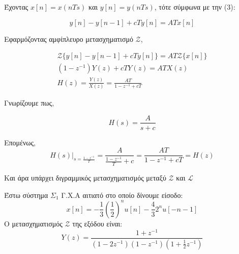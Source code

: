 \documentclass{assignment}
\begin{document}
\begin{answers}
\answer

Έχοντας $x[n] = x(nTs)$ και $y[n] = y(nTs)$, τότε σύμφωνα με την (3):

\begin{equation*}
y[n] - y[n-1] + cTy[n] = ATx[n]
\end{equation*}

Εφαρμόζοντας αμφίπλευρο μετασχηματισμό $\mathscr{Z}$,

\begin{gather*}
\mathscr{Z}\bigg\{y[n] - y[n-1] + cTy[n]\bigg\} = AT\mathscr{Z}\bigg\{x[n]\bigg\} \\
(1-z^{-1})Y(z) + cTY(z) = ATX(z)\\
H(z) = \frac{Y(z)}{X(z)} = \frac{AT}{1-z^{-1}+cT} 
\end{gather*}

\answer
Γνωρίζουμε πως,

\begin{equation*}
H(s) = \frac{A}{s+c}
\end{equation*}

Επομένως, 
\begin{equation*}
\left.H(s)\right|_{s=\frac{1-z^{-1}}{T}} = \frac{A}{\frac{1-z^{-1}}{T} + c} = \frac{AT}{1-z^{-1}+cT} = H(z)
\end{equation*}

Και άρα υπάρχει διγραμμικός μετασχηματισμός μεταξύ $\mathscr{Z}$ και $\mathscr{L}$

\end{answers}


Έστω σύστημα $\Sigma_1$ Γ.Χ.Α αιτιατό στο οποίο δίνουμε είσοδο:
\begin{equation}
x[n]=-\frac{1}{3}(\frac{1}{2})^nu[n]-\frac{4}{3}2^nu[-n-1]
\end{equation}
Ο μετασχηματισμός $\mathscr{Z}$ της εξόδου είναι:
\begin{equation}Y(z) = \frac{1+z^{-1}}{(1-2z^{-1})(1-z^{-1})(1+\frac{1}{2}z^{-1})}\end{equation}
\end{document}
